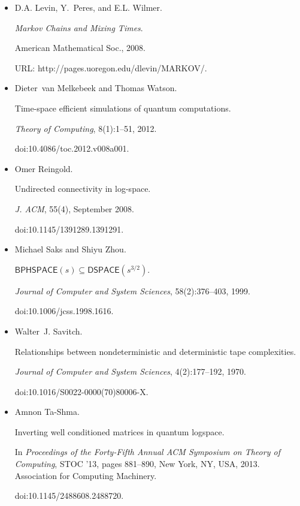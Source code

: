\begin{itemize}
\item[] 
[19]

D.A. Levin, Y. Peres, and E.L. Wilmer.


\emph{Markov Chains and Mixing Times}.


American Mathematical Soc., 2008.


URL: http://pages.uoregon.edu/dlevin/MARKOV/.





\item[] 
[20]

Dieter van Melkebeek and Thomas Watson.


Time-space efficient simulations of quantum computations.


\emph{Theory of Computing}, 8(1):1–51, 2012.


doi:10.4086/toc.2012.v008a001.





\item[] 
[21]

Omer Reingold.


Undirected connectivity in log-space.


\emph{J. ACM}, 55(4), September 2008.


doi:10.1145/1391289.1391291.





\item[] 
[22]

Michael Saks and Shiyu Zhou.


$\mathsf{BPHSPACE}(s)\subseteq\mathsf{DSPACE}(s^{3/2})$.


\emph{Journal of Computer and System Sciences}, 58(2):376–403, 1999.


doi:10.1006/jcss.1998.1616.





\item[] 
[23]

Walter J. Savitch.


Relationships between nondeterministic and deterministic tape
complexities.


\emph{Journal of Computer and System Sciences}, 4(2):177–192, 1970.


doi:10.1016/S0022-0000(70)80006-X.





\item[] 
[24]

Amnon Ta-Shma.


Inverting well conditioned matrices in quantum logspace.


In \emph{Proceedings of the Forty-Fifth Annual ACM Symposium on Theory
of Computing}, STOC ’13, pages 881–890, New York, NY, USA, 2013. Association
for Computing Machinery.


doi:10.1145/2488608.2488720.





\end{itemize}




